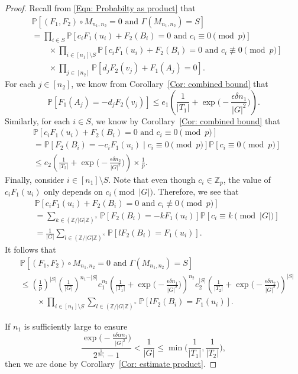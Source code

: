 \documentclass[12pt]{amsart}
\theoremstyle{definition}
\newcommand{\PPP}{\mathbb{P}}
\newcommand{\Mnot}{M_{n_1,n_2}}
\newcommand{\abs}[1]{\vert#1\vert}
\newcommand{\Zp}{\Z_p}
\newcommand{\Z}{\mathbb{Z}}
\begin{document}
\begin{proof}
Recall from \eqref{Eqn: Probabilty as product} that
\begin{align*}
&\PPP[(F_1,F_2)\circ \Mnot=0 \text{ and }\Gamma(\Mnot)=S]\\
&=\prod_{i\in S} \PPP[c_iF_1(u_i) +F_2(B_i)=0\text{ and } c_i\equiv 0\pmod{p}]\\
&\quad\quad\times\prod_{i\in [n_1]\setminus S} \PPP[c_iF_1(u_i) +F_2(B_i)=0\text{ and } c_i\not\equiv 0\pmod{p}]\\
&\quad\quad\times\prod_{j\in [n_2]} \PPP[d_jF_2(v_j) +F_1(A_j)=0].
\end{align*}
For each $j\in [n_2]$, we know from Corollary~\ref{Cor: combined bound} that
\[
\PPP[F_1(A_j)= -d_jF_2(v_j)]
\leq e_1\left( \frac{1}{\abs{T_1}} + \exp\Big(-\frac{\epsilon \delta n_1}{|G|^2}\Big)\right).\]
Similarly, for each $i\in S$, we know by Corollary~\ref{Cor: combined bound} that
\begin{align*}
&\PPP[c_iF_1(u_i) +F_2(B_i)=0\text{ and } c_i\equiv 0\pmod{p}]\\
&=\PPP[ F_2(B_i)=- c_iF_1(u_i)\mid c_i\equiv 0\pmod{p}]
\PPP[c_i\equiv 0\pmod{p}]\\
&\leq e_2 \left( \frac{1}{\abs{T_2}} + \exp\Big(-\frac{\epsilon \delta n_2}{|G|^2}\Big)\right) \times \frac{1}{p}.
\end{align*}
Finally, consider $i\in [n_1]\setminus S$. Note that even though $c_i\in \Zp$, the value of $c_i F_1(u_i)$ only depends on $c_i\pmod{\abs{G}}$.
Therefore, we see that
\begin{align*}
&\PPP[c_iF_1(u_i) +F_2(B_i)=0\text{ and } c_i\not\equiv 0\pmod{p}]\\
&=\sum_{k\in (\Z/\abs{G}\Z)^{\times}} \PPP[F_2(B_i)= -kF_1(u_i)] \PPP[c_i\equiv k\pmod{\abs{G}}]\\
&=\frac{1}{\abs{G}} \sum_{l\in (\Z/\abs{G}\Z)^{\times}} \PPP[l F_2(B_i)= F_1(u_i)].
\end{align*}
It follows that
\begin{align*}
&\PPP[(F_1,F_2)\circ \Mnot=0 \text{ and }\Gamma(\Mnot)=S]\\
&\leq (\tfrac{1}{p})^{\abs{S}} (\tfrac{1}{\abs{G}})^{n_1-\abs{S}}
e_1^{n_2}
\left(\frac{1}{\abs{T_1}} + \exp\Big(-\frac{\epsilon \delta n_1}{|G|^2}\Big)\right)^{n_2}
e_2^{\abs{S}}
\left( \frac{1}{\abs{T_2}} + \exp\Big(-\frac{\epsilon \delta n_2}{|G|^2}\Big)\right)^{\abs{S}}\\
&\quad\quad\times \prod_{i\in [n_1]\setminus S} \sum_{l\in (\Z/\abs{G}\Z)^{\times}} \PPP[l F_2(B_i)= F_1(u_i)].
\end{align*}

If $n_1$ is sufficiently large to ensure
\[
\frac{\exp\Big(-\frac{\epsilon \delta \alpha n_1}{|G|^2}\Big)}{2^{\frac{1}{2n_1}}-1}
<\frac{1}{\abs{G}}\leq \min\Big(\frac{1}{\abs{T_1}}, \frac{1}{\abs{T_2}}\Big),
\]
then we are done by Corollary~\ref{Cor: estimate product}.
\end{proof}
\end{document}
